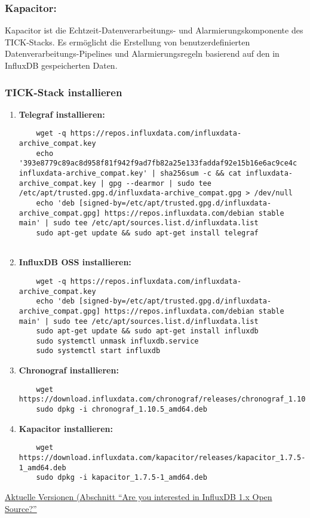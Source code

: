 \subsubsection{Kapacitor:}
Kapacitor ist die Echtzeit-Datenverarbeitungs- und Alarmierungskomponente des TICK-Stacks. Es ermöglicht die Erstellung von benutzerdefinierten Datenverarbeitungs-Pipelines und Alarmierungsregeln basierend auf den in InfluxDB gespeicherten Daten.
\newpage
\subsubsection{TICK-Stack installieren}
\begin{enumerate}
    \item \textbf{Telegraf installieren:}
    \begin{verbatim}
    wget -q https://repos.influxdata.com/influxdata-archive_compat.key
    echo '393e8779c89ac8d958f81f942f9ad7fb82a25e133faddaf92e15b16e6ac9ce4c influxdata-archive_compat.key' | sha256sum -c && cat influxdata-archive_compat.key | gpg --dearmor | sudo tee /etc/apt/trusted.gpg.d/influxdata-archive_compat.gpg > /dev/null
    echo 'deb [signed-by=/etc/apt/trusted.gpg.d/influxdata-archive_compat.gpg] https://repos.influxdata.com/debian stable main' | sudo tee /etc/apt/sources.list.d/influxdata.list
    sudo apt-get update && sudo apt-get install telegraf
    
    \end{verbatim}
    \item \textbf{InfluxDB OSS installieren:}
    \begin{verbatim}
    wget -q https://repos.influxdata.com/influxdata-archive_compat.key
    echo 'deb [signed-by=/etc/apt/trusted.gpg.d/influxdata-archive_compat.gpg] https://repos.influxdata.com/debian stable main' | sudo tee /etc/apt/sources.list.d/influxdata.list
    sudo apt-get update && sudo apt-get install influxdb
    sudo systemctl unmask influxdb.service
    sudo systemctl start influxdb
    \end{verbatim}
    \item \textbf{Chronograf installieren:}
    \begin{verbatim}
    wget https://download.influxdata.com/chronograf/releases/chronograf_1.10.5_amd64.deb
    sudo dpkg -i chronograf_1.10.5_amd64.deb
    \end{verbatim}
    \item \textbf{Kapacitor installieren:}
    \begin{verbatim}
    wget https://download.influxdata.com/kapacitor/releases/kapacitor_1.7.5-1_amd64.deb
    sudo dpkg -i kapacitor_1.7.5-1_amd64.deb
    \end{verbatim}
\end{enumerate}
\href{https://www.influxdata.com/downloads/}{Aktuelle Versionen (Abschnitt \enquote{Are you interested in InfluxDB 1.x Open Source?}}

